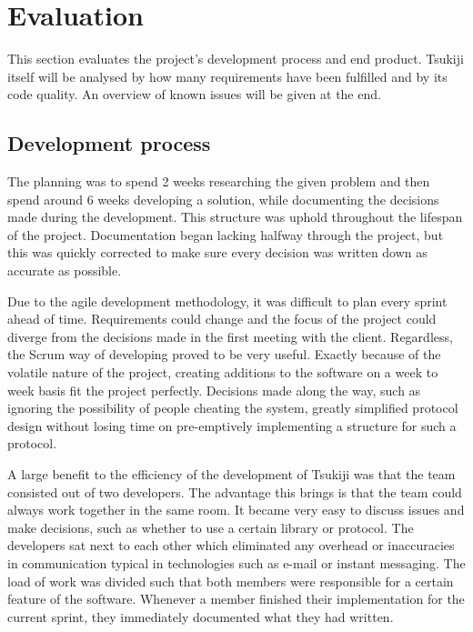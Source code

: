 \section{Evaluation}
\label{evaluation}
This section evaluates the project's development process and end product.
Tsukiji itself will be analysed by how many requirements have been fulfilled and by its code quality.
An overview of known issues will be given at the end.

\subsection{Development process}
The planning was to spend 2 weeks researching the given problem and then spend around 6 weeks developing a solution, while documenting the decisions made during the development.
This structure was uphold throughout the lifespan of the project.
Documentation began lacking halfway through the project, but this was quickly corrected to make sure every decision was written down as accurate as possible.

Due to the agile development methodology, it was difficult to plan every sprint ahead of time.
Requirements could change and the focus of the project could diverge from the decisions made in the first meeting with the client.
Regardless, the Scrum way of developing proved to be very useful.
Exactly because of the volatile nature of the project, creating additions to the software on a week to week basis fit the project perfectly. 
Decisions made along the way, such as ignoring the possibility of people cheating the system, greatly simplified protocol design without losing time on pre-emptively implementing a structure for such a protocol.

A large benefit to the efficiency of the development of Tsukiji was that the team consisted out of two developers.
The advantage this brings is that the team could always work together in the same room.
It became very easy to discuss issues and make decisions, such as whether to use a certain library or protocol.
The developers sat next to each other which eliminated any overhead or inaccuracies in communication typical in technologies such as e-mail or instant messaging.
The load of work was divided such that both members were responsible for a certain feature of the software.
Whenever a member finished their implementation for the current sprint, they immediately documented what they had written.

